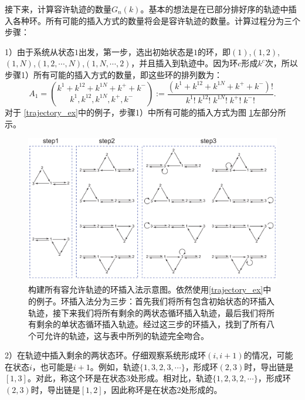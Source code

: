 接下来，计算容许轨迹的数量$G_n(k)$。基本的想法是在已部分排好序的轨迹中插入各种环。所有可能的插入方式的数量将会是容许轨迹的数量。计算过程分为三个步骤：

1）由于系统从状态$1$出发，第一步，选出初始状态是$1$的环，即$(1)$,$(1,2)$,$(1,N)$,$(1,2,\cdots,N)$,$(1,N,\cdots,2)$，并且插入到轨迹中。因为环$c$形成$k^c$次，所以步骤1）所有可能的插入方式的数量，即这些环的排列数为：
\begin{equation*}\label{formula:A1}
    A_1 = \binom{k^1+k^{12}+k^{1N}+k^{+}+k^{-}}{k^1,k^{12},k^{1N},k^{+},k^{-}}
    := \frac{(k^1+k^{12}+k^{1N}+k^{+}+k^{-})!}{k^1!\;k^{12}!\;k^{1N}!\;k^{+}!\;k^{-}!}.
\end{equation*}
对于 \ref{trajectory_ex}中的例子，步骤1）中所有可能的插入方式为图 \ref{figure:insertion}左部分所示。
\begin{figure}[htb!]
\centering
\includegraphics[scale=0.6]{chart/insertiongraph.pdf}
\caption{构建所有容允许轨迹的环插入法示意图。依然使用\ref{trajectory_ex}中的例子。环插入法分为三步：首先我们将所有包含初始状态的环插入轨迹，接下来我们将所有剩余的两状态循环插入轨迹，最后我们将所有剩余的单状态循环插入轨迹。经过这三步的环插入，找到了所有八个可允许的轨迹，这与表中所列的轨迹完全吻合。}
\label{figure:insertion}
\end{figure}

2）在轨迹中插入剩余的两状态环。仔细观察系统形成环$(i,i+1)$的情况，可能在状态$i$，也可能是$i+1$。例如，轨迹$\{1, 3, 2, 3, \cdots\}$，形成环$(2,3)$时，导出链是$[1, 3]$。对此，称这个环是在状态$3$处形成。相对比，轨迹$\{1,2,3,2, \cdots\}$，形成环$(2,3)$时，导出链是$[1, 2]$，因此称环是在状态$2$处形成的。

